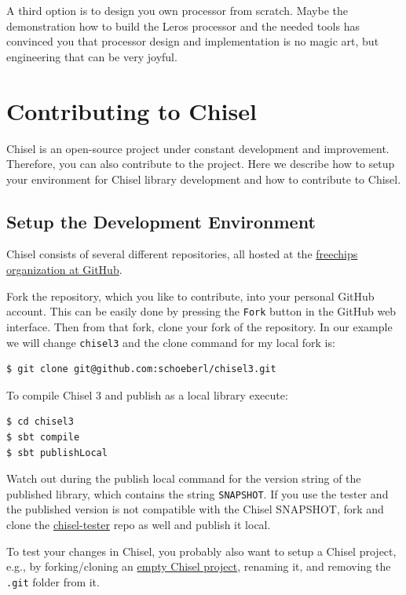 \documentclass[%
    10pt, %
    headinclude, footexclude,
    openright, %
    notitlepage,
    cleardoubleempty,
    headsepline,
    pointlessnumbers,
    bibtotoc, idxtotoc,
    ]{scrbook}
\newcommand{\code}[1]{{\small{\texttt{#1}}}}
\newcommand{\myref}[2]{\href{#1}{#2}}
\begin{document}
A third option is to design you own processor from scratch. Maybe the demonstration
how to build the Leros processor and the needed tools has convinced you that processor
design and implementation is no magic art, but engineering that can be very joyful.

\chapter{Contributing to Chisel}

Chisel is an open-source project under constant development and improvement.
Therefore, you can also contribute to the project. Here we describe how to
setup your environment for Chisel library development and how to contribute
to Chisel.

\section{Setup the Development Environment}

Chisel consists of several different repositories, all hosted at
the \myref{https://github.com/freechipsproject}{freechips organization at GitHub}.

Fork the repository, which you like to contribute, into your personal GitHub account.
This can be easily done by pressing the \code{Fork} button in the GitHub web interface.
Then from that fork, clone your fork of the repository. In our example we will change
\code{chisel3} and the clone command for my local fork is:

\begin{verbatim}
$ git clone git@github.com:schoeberl/chisel3.git
\end{verbatim}

To compile Chisel 3 and publish as a local library execute:
\begin{verbatim}
$ cd chisel3
$ sbt compile
$ sbt publishLocal
\end{verbatim}

Watch out during the publish local command for the version string of the published
library, which contains the string \code{SNAPSHOT}.
If you use the tester and the published version is not compatible with the Chisel
SNAPSHOT, fork and clone the \myref{https://github.com/freechipsproject/chisel-testers}{chisel-tester}
repo as well and publish it local.

To test your changes in Chisel, you probably also want to setup a Chisel project,
e.g., by forking/cloning an \myref{https://github.com/schoeberl/chisel-empty}{empty Chisel project},
renaming it, and removing the \code{.git} folder from it.
\end{document}
